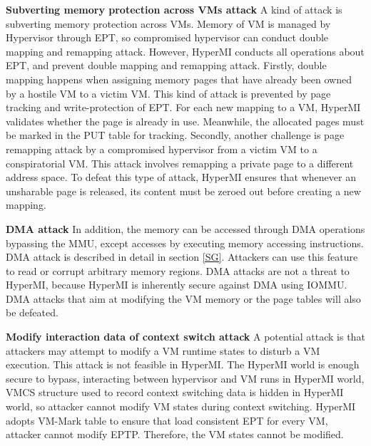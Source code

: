 \documentclass[conference]{IEEEtran}
\begin{document}
\textbf{Subverting memory protection across VMs attack}
A kind of attack is subverting memory protection across VMs. Memory of VM is managed by Hypervisor through EPT, so compromised hypervisor can conduct double mapping and remapping attack. However, HyperMI conducts all operations about EPT, and prevent double mapping and remapping attack.
Firstly, double mapping happens when assigning memory pages that have already been owned by a hostile VM to a victim VM. This kind of attack is prevented by page tracking and write-protection of EPT. For each new mapping to a VM, HyperMI validates whether the page is already in use. Meanwhile, the allocated pages must be marked in the PUT table for tracking. Secondly, another challenge is page remapping attack by a compromised hypervisor from a victim VM to a conspiratorial VM. This attack involves remapping a private page to a different address space. To defeat this type of attack, HyperMI ensures that whenever an unsharable page is released, its content must be zeroed out before creating a new mapping.

\textbf{DMA attack}
In addition, the memory can be accessed through DMA operations bypassing the MMU, except accesses by executing memory accessing instructions. DMA attack is described in detail in section \ref{SG}. Attackers can use this feature to read or corrupt arbitrary memory regions. DMA attacks are not a threat to HyperMI, because HyperMI is inherently secure against DMA using IOMMU. DMA attacks that aim at modifying the VM memory or the page tables will also be defeated.

\textbf{Modify interaction data of context switch attack}
A potential attack is that attackers may attempt to modify a VM runtime states to disturb a VM execution. This attack is not feasible in HyperMI. The HyperMI world is enough secure to bypass, interacting between  hypervisor and VM runs in HyperMI world, VMCS structure used to record context switching data is hidden in HyperMI world, so attacker cannot modify VM states during context switching. HyperMI adopts VM-Mark table to ensure that load consistent EPT for every VM, attacker cannot modify EPTP. Therefore, the VM states cannot be modified.
\end{document}
